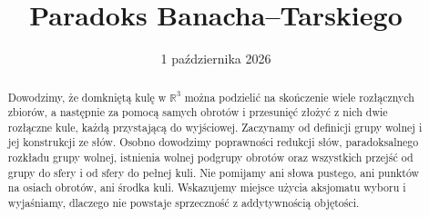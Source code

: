 \documentclass[11pt,a4paper]{article}
\title{Paradoks Banacha--Tarskiego}
\author{}
\date{1 października 2026}
\numberwithin{equation}{section}
\theoremstyle{plain}
\theoremstyle{definition}
\theoremstyle{remark}
\newcommand{\R}{\mathbb R}
\begin{document}
\maketitle
\begin{abstract}
Dowodzimy, że domkniętą kulę w $\R^3$ można podzielić na skończenie wiele rozłącznych zbiorów, a następnie za pomocą samych obrotów i przesunięć złożyć z nich dwie rozłączne kule, każdą przystającą do wyjściowej. Zaczynamy od definicji grupy wolnej i jej konstrukcji ze słów. Osobno dowodzimy poprawności redukcji słów, paradoksalnego rozkładu grupy wolnej, istnienia wolnej podgrupy obrotów oraz wszystkich przejść od grupy do sfery i od sfery do pełnej kuli. Nie pomijamy ani słowa pustego, ani punktów na osiach obrotów, ani środka kuli. Wskazujemy miejsce użycia aksjomatu wyboru i wyjaśniamy, dlaczego nie powstaje sprzeczność z addytywnością objętości.
\end{abstract}
\tableofcontents












\end{document}
